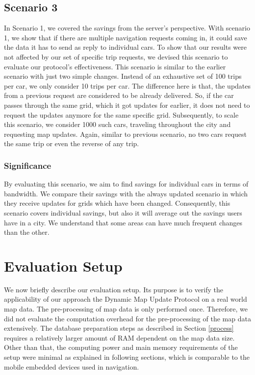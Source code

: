 \subsection{Scenario 3 } \label{10trips}
In Scenario 1, we covered the savings from the server's perspective. With scenario 1, we show that if there are multiple navigation requests coming in, it could save the data it has to send as reply to individual cars. To show that our results were not affected by our set of specific trip requests, we devised this scenario to evaluate our protocol's effectiveness. This scenario is similar to the earlier scenario with just two simple changes. Instead of an exhaustive set of 100 trips per car, we only consider 10 trips per car. The difference here is that, the updates from a previous request are considered to be already delivered. So, if the car passes through the same grid, which it got updates for earlier, it does not need to request the updates anymore for the same specific grid. Subsequently, to scale this scenario, we consider 1000 such cars, traveling throughout the city and requesting map updates. Again, similar to previous scenario, no two cars request the same trip or even the reverse of any trip.\\

\subsubsection{Significance}
By evaluating this scenario, we aim to find savings for individual cars in terms of bandwidth. We compare their savings with the always updated scenario in which they receive updates for grids which have been changed. Consequently, this scenario covers individual savings, but also it will average out the savings users have in a city. We understand that some areas can have much frequent changes than the other. 







 
\section{Evaluation Setup}\label{setup}
We now briefly describe our evaluation setup. Its purpose is to verify the applicability of our approach the Dynamic Map Update Protocol on a real world map data. The pre-processing of map data is only performed once. Therefore, we did not evaluate the computation overhead for the pre-processing of the map data extensively. The database preparation steps as described in Section \ref{process} requires a relatively larger amount of RAM dependent on the map data size. Other than that, the computing power and main memory requirements of the setup were minimal as explained in following sections, which is comparable to the mobile embedded devices used in navigation. 

